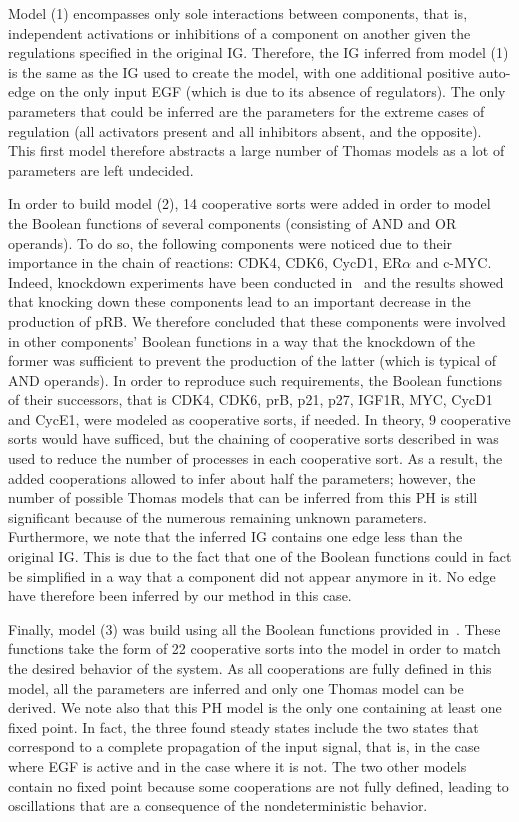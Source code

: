 Model (1) encompasses only sole interactions between components, that is,
independent activations or inhibitions of a component on another given the regulations specified in the original IG.
Therefore, the IG inferred from model (1) is the same as the IG used to create the model,
with one additional positive auto-edge on the only input EGF (which is due to its absence of regulators).
The only parameters that could be inferred are the parameters for the extreme cases of regulation
(all activators present and all inhibitors absent, and the opposite).
This first model therefore abstracts a large number of Thomas models as a lot of parameters are left undecided.

In order to build model (2), 14 cooperative sorts were added in order to model the Boolean functions of several components
(consisting of AND and OR operands).
To do so, the following components were noticed due to their importance in the chain of reactions:
CDK4, CDK6, CycD1, ER$\alpha$ and c-MYC.
Indeed, knockdown experiments have been conducted in~\cite{Sahin09}
and the results showed that knocking down these components lead to an important decrease in the production of pRB.
We therefore concluded that these components were involved in other components' Boolean functions
in a way that the knockdown of the former was sufficient to prevent the production of the latter (which is typical of AND operands).
In order to reproduce such requirements, the Boolean functions of their successors,
that is CDK4, CDK6, prB, p21, p27, IGF1R, MYC, CycD1 and CycE1,
were modeled as cooperative sorts, if needed.
In theory, 9 cooperative sorts would have sufficed, but the chaining of cooperative sorts described
in  was used to reduce the number of processes in each cooperative sort.
As a result, the added cooperations allowed to infer about half the parameters;
however, the number of possible Thomas models that can be inferred from this PH is still significant
because of the numerous remaining unknown parameters.
Furthermore, we note that the inferred IG contains one edge less than the original IG. This is due to the fact that
one of the Boolean functions could in fact be simplified in a way that a component did not appear anymore in it.
No edge have therefore been inferred by our method in this case.

Finally, model (3) was build using all the Boolean functions provided in~\cite{Sahin09}.
These functions take the form of 22 cooperative sorts into the model in order to match the desired behavior of the system.
As all cooperations are fully defined in this model, all the parameters are inferred and only one Thomas model can be derived.
We note also that this PH model is the only one containing at least one fixed point.
In fact, the three found steady states include the two states that correspond to a complete propagation of the input signal,
that is, in the case where EGF is active and in the case where it is not.
The two other models contain no fixed point because some cooperations are not fully defined,
leading to oscillations that are a consequence of the nondeterministic behavior.



